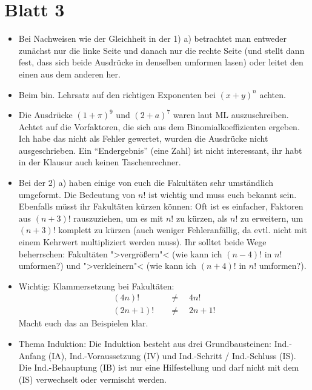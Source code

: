 \documentclass[11pt, a4paper]{article}
\begin{document}
\newpage
\section*{Blatt 3}
\begin{itemize}
\item Bei Nachweisen wie der Gleichheit in der 1) a) betrachtet man entweder zunächst nur die linke Seite und danach nur die rechte Seite (und stellt dann fest, dass sich beide Ausdrücke in denselben umformen lasen) oder leitet den einen aus dem anderen her.

\item Beim bin. Lehrsatz auf den richtigen Exponenten bei $(x + y)^n$ achten.

\item Die Ausdrücke $(1 + \pi)^9$ und $(2 + a)^7$ waren laut ML auszuschreiben. Achtet auf die Vorfaktoren, die sich aus dem Binomialkoeffizienten ergeben. Ich habe das nicht als Fehler gewertet, wurden die Ausdrücke nicht ausgeschrieben. Ein \enquote{Endergebnis} (eine Zahl) ist nicht interessant, ihr habt in der Klausur auch keinen Taschenrechner.

\item Bei der 2) a) haben einige von euch die Fakultäten sehr umständlich umgeformt. Die Bedeutung von $n!$ ist wichtig und muss euch bekannt sein. Ebenfalls müsst ihr Fakultäten kürzen können: Oft ist es einfacher, Faktoren aus $(n+3)!$ rauszuziehen, um es mit $n!$ zu kürzen, als $n!$ zu erweitern, um $(n+3)!$ komplett zu kürzen (auch weniger Fehleranfällig, da evtl. nicht mit einem Kehrwert multipliziert werden muss). Ihr solltet beide Wege beherrschen: Fakultäten ">vergrößern"< (wie kann ich $(n-4)!$ in $n!$ umformen?) und ">verkleinern"< (wie kann ich $(n+4)!$ in $n!$ umformen?).

\item Wichtig: Klammersetzung bei Fakultäten:
\begin{align*}
(4n)! \quad &\neq \quad 4n!\\
(2n + 1)!\quad &\neq \quad 2n + 1!
\end{align*}
Macht euch das an Beispielen klar.

\item Thema Induktion: Die Induktion besteht aus drei Grundbausteinen: Ind.-Anfang (IA), Ind.-Voraussetzung (IV) und Ind.-Schritt / Ind.-Schluss (IS). Die Ind.-Behauptung (IB) ist nur eine Hilfestellung und darf nicht mit dem (IS) verwechselt oder vermischt werden.


\end{itemize}
\end{document}
